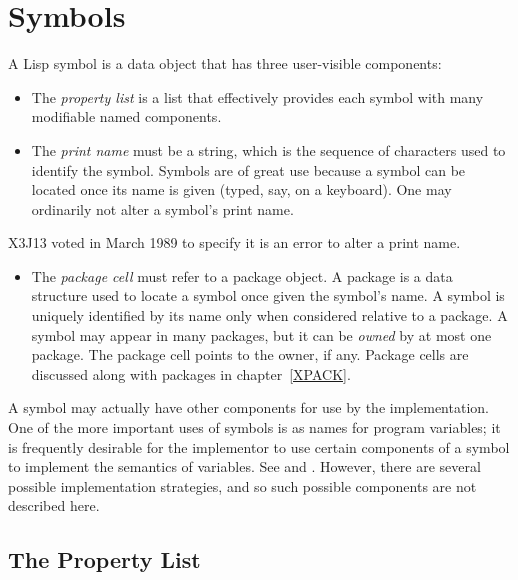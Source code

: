 
\clearpage\def\pagestatus{ULTIMATE}


\chapter{Symbols}
\label{symbol}

A Lisp symbol is a data object that has three user-visible
components:
\begin{itemize}
\item
The {\it property list} is a list that effectively provides each symbol
with many modifiable named components.

\item
The {\it print name} must be a string, which is the sequence of
characters used to identify the symbol.  Symbols are of great use
because a symbol can be located once its name is given
(typed, say, on a keyboard).
One may ordinarily not alter a symbol's print name.
\end{itemize}

\begin{newer}
X3J13 voted in March 1989 
to specify it is an error to alter a print name.
\end{newer}
\begin{itemize}
\item
The {\it package cell} must refer to a package object.
A package is a data structure
used to locate a symbol once given the symbol's name.
A symbol is uniquely identified
by its name only when considered relative to a package.  A symbol may
appear in many packages, but it can be {\it owned} by at most one package.
The package cell points to the owner, if any.
Package cells are discussed along with packages in chapter~\ref{XPACK}.
\end{itemize}

A symbol may actually have other components for use by the
implementation.  One of the more important uses of symbols is as
names for program variables; it is frequently desirable for the
implementor to use certain components of a symbol to implement
the semantics of variables.  See 
and .
However, there are several possible
implementation strategies, and so such possible components are not
described here.

\section{The Property List}

